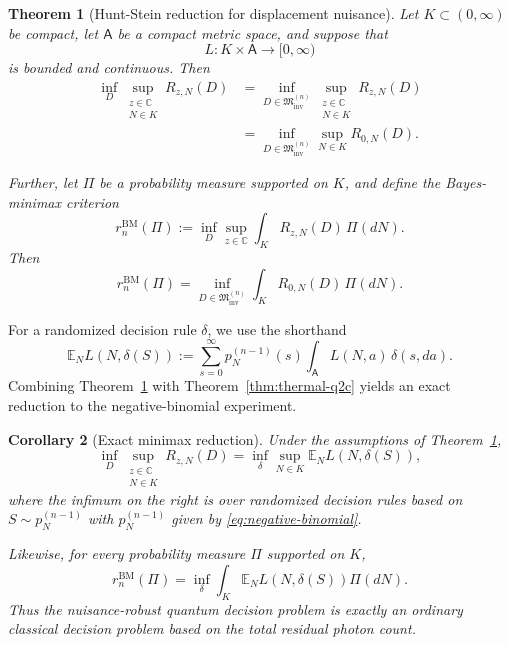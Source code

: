 \documentclass{article}
\newtheorem{theorem}{Theorem}[section]
\newtheorem{corollary}[theorem]{Corollary}
\theoremstyle{named}
\theoremstyle{named1}
\newcommand{\N}{\mathbb{N}}
\newcommand{\E}{\mathbb{E}}
\newcommand{\bbC}{\mathbb C}
\newcommand{\cM}{\mathfrak M}
\theoremstyle{plain}
\theoremstyle{remark}
\begin{document}
\begin{theorem}[Hunt-Stein reduction for displacement nuisance]
\label{thm:hunt-stein-thermal}
Let \(K\subset(0,\infty)\) be compact, let \(\mathsf A\) be a compact metric
space, and suppose that
\[
    L:K\times\mathsf A\rightarrow[0,\infty)
\]
is bounded and continuous. Then
\begin{align}
    \inf_D
    \sup_{\substack{z\in\bbC\\N\in K}}
    R_{z,N}(D)
    &=
    \inf_{D\in\cM_{\mathrm{inv}}^{(n)}}
    \sup_{\substack{z\in\bbC\\N\in K}}
    R_{z,N}(D)
    \nonumber\\
    &=
    \inf_{D\in\cM_{\mathrm{inv}}^{(n)}}
    \sup_{N\in K}
    R_{0,N}(D).
    \label{eq:minimax-symmetry}
\end{align}

Further, let \(\Pi\) be a probability measure supported on \(K\), and
define the Bayes-minimax criterion
\begin{equation}
    r_n^{\mathrm{BM}}(\Pi)
    :=
    \inf_D
    \sup_{z\in\bbC}
    \int_K
        R_{z,N}(D)\,
        \Pi(dN).
    \label{eq:bayes-minimax}
\end{equation}
Then
\begin{equation}
    r_n^{\mathrm{BM}}(\Pi)
    =
    \inf_{D\in\cM_{\mathrm{inv}}^{(n)}}
    \int_K
        R_{0,N}(D)\,
        \Pi(dN).
    \label{eq:bayes-minimax-invariant}
\end{equation}
\end{theorem}








For a randomized decision rule $\delta$, we use the shorthand
\[
\E_N L(N,\delta(S))
:=
\sum_{s=0}^{\infty}
p_N^{(n-1)}(s)
\int_{\mathsf A}L(N,a)\,\delta(s,da).
\]
Combining Theorem~\ref{thm:hunt-stein-thermal} with
Theorem~\ref{thm:thermal-q2c} yields an exact reduction to the
negative-binomial experiment.

\begin{corollary}[Exact minimax reduction]
\label{cor:thermal-minimax}
Under the assumptions of Theorem~\ref{thm:hunt-stein-thermal},
\begin{equation}
    \inf_D
    \sup_{\substack{z\in\bbC\\N\in K}}
    R_{z,N}(D)
    =
    \inf_{\delta}
    \sup_{N\in K}
    \E_N
    L\!\left(N,\delta(S)\right),
    \label{eq:exact-minimax-reduction}
\end{equation}
where the infimum on the right is over randomized decision rules based on
$S\sim p_N^{(n-1)}$
with \(p_N^{(n-1)}\) given by
\eqref{eq:negative-binomial}.

Likewise, for every probability measure \(\Pi\) supported on \(K\),
\begin{equation}
    r_n^{\mathrm{BM}}(\Pi)
    =
    \inf_\delta
    \int_K
        \E_N
        L\!\left(N,\delta(S)\right)
        \Pi(dN).
    \label{eq:exact-bayes-reduction}
\end{equation}
Thus the nuisance-robust quantum decision problem is exactly an ordinary
classical decision problem based on the total residual photon count.
\end{corollary}
\end{document}
